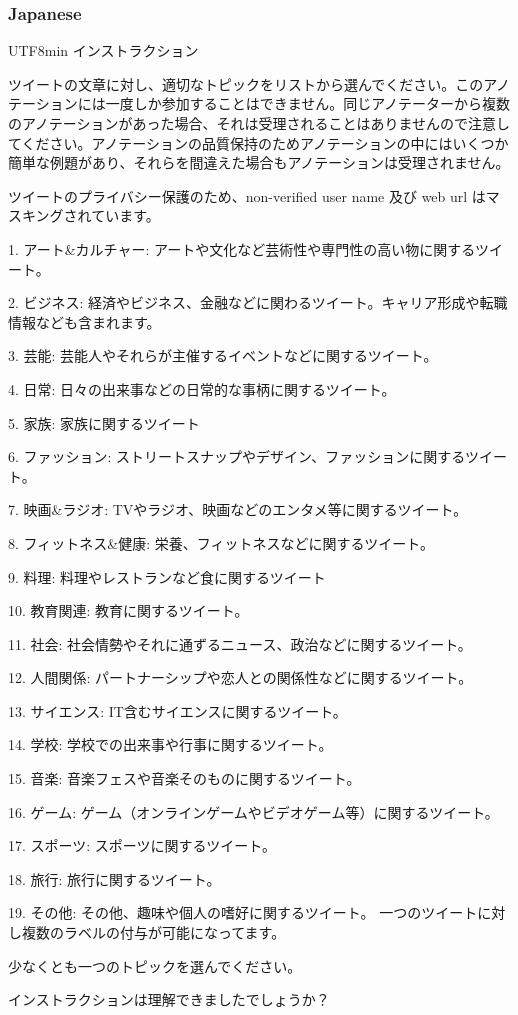\subsubsection{Japanese}
\begin{CJK*}{UTF8}{min}
インストラクション

ツイートの文章に対し、適切なトピックをリストから選んでください。このアノテーションには一度しか参加することはできません。同じアノテーターから複数のアノテーションがあった場合、それは受理されることはありませんので注意してください。アノテーションの品質保持のためアノテーションの中にはいくつか簡単な例題があり、それらを間違えた場合もアノテーションは受理されません。

ツイートのプライバシー保護のため、non-verified user name 及び web url はマスキングされています。

1. アート\&カルチャー: アートや文化など芸術性や専門性の高い物に関するツイート。

2. ビジネス: 経済やビジネス、金融などに関わるツイート。キャリア形成や転職情報なども含まれます。

3. 芸能: 芸能人やそれらが主催するイベントなどに関するツイート。

4. 日常: 日々の出来事などの日常的な事柄に関するツイート。

5. 家族: 家族に関するツイート

6. ファッション: ストリートスナップやデザイン、ファッションに関するツイート。

7. 映画\&ラジオ: TVやラジオ、映画などのエンタメ等に関するツイート。

8. フィットネス\&健康: 栄養、フィットネスなどに関するツイート。

9. 料理: 料理やレストランなど食に関するツイート

10. 教育関連: 教育に関するツイート。

11. 社会: 社会情勢やそれに通ずるニュース、政治などに関するツイート。

12. 人間関係: パートナーシップや恋人との関係性などに関するツイート。

13. サイエンス: IT含むサイエンスに関するツイート。

14. 学校: 学校での出来事や行事に関するツイート。

15. 音楽: 音楽フェスや音楽そのものに関するツイート。

16. ゲーム: ゲーム（オンラインゲームやビデオゲーム等）に関するツイート。

17. スポーツ: スポーツに関するツイート。

18. 旅行: 旅行に関するツイート。

19. その他: その他、趣味や個人の嗜好に関するツイート。
一つのツイートに対し複数のラベルの付与が可能になってます。

少なくとも一つのトピックを選んでください。
 
インストラクションは理解できましたでしょうか？
\end{CJK*}


